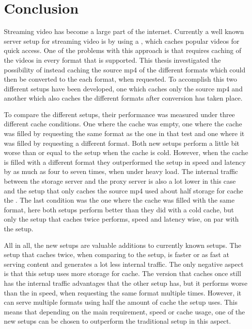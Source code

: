 \documentclass[twoside,openright]{uva-bachelor-thesis}
\begin{document}
\chapter{Conclusion}
Streaming video has become a large part of the internet. Currently a well
known server setup for streaming video is by using a \cdn, which caches popular
videos for quick access. One of the problems with this approach is that requires
caching of the videos in every format that is supported. This thesis
investigated the possibility of instead caching the source mp4 of the different
formats which could then be converted to the each format, when requested.
To accomplish this two different setups have been developed, one which caches
only the source mp4 and another which also caches the different formats after
conversion has taken place.

To compare the different setups, their performance was measured under three
different cache conditions. One where the cache was empty, one where the cache
was filled by requesting the same format as the one in that test and one where
it was filled by requesting a different format. Both new setups perform a little
bit worse than or equal to the \cdn setup when the cache is cold.  However, when
the cache is filled with a different format they outperformed the \cdn setup in
speed and latency by as much as four to seven times, when under heavy load. The
internal traffic between the storage server and the proxy server is also a lot
lower in this case and the setup that only caches the source mp4 used about half
storage for cache the \cdn. The last condition was the one where the cache was
filled with the same format, here both setups perform better than they did with
a cold cache, but only the setup that caches twice performs, speed and latency
wise, on par with the \cdn setup.

All in all, the new setups are valuable additions to currently known setups. The
setup that caches twice, when comparing to the \cdn setup, is faster or as
fast at serving content and generates a lot less internal traffic. The only
negative aspect is that this setup uses more storage for cache. The version that
caches once still has the internal traffic advantages that the other setup has,
but it performs worse than the \cdn in speed, when requesting the same format
multiple times. However, it can serve multiple formats using half the amount of
cache the \cdn setup uses. This means that depending on the main requirement,
speed or cache usage, one of the new setups can be chosen to outperform the
traditional \cdn setup in this aspect.






\printbibliography[heading=bibintoc]{}

\printglossaries{}
\end{document}
